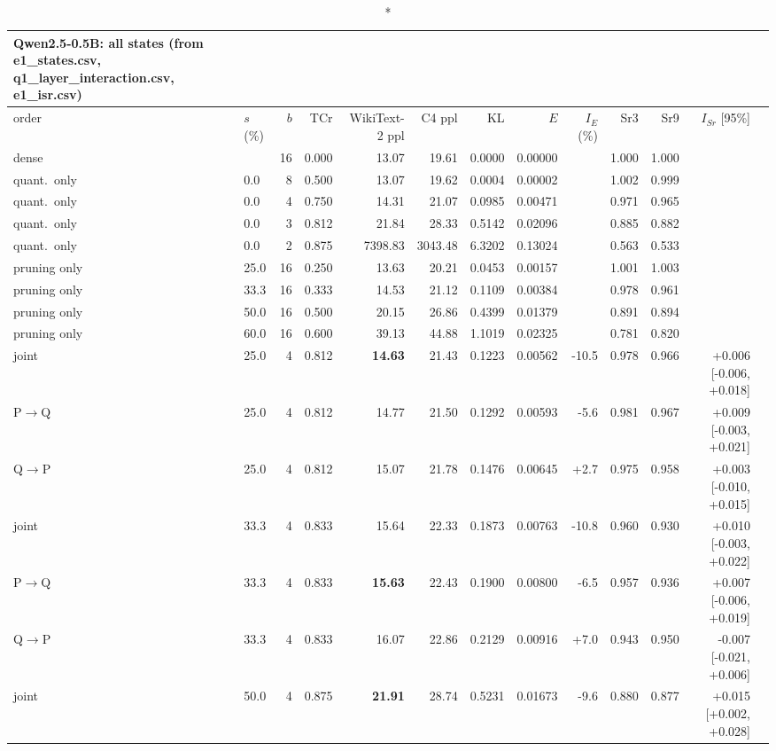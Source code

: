 \documentclass{article}
\begin{document}
\begin{longtable}{llrrrrrrrrrrl}
\caption*{\textbf{Qwen2.5-0.5B}: all states (from e1\_states.csv, q1\_layer\_interaction.csv, e1\_isr.csv)}\\
\toprule order & $s$ (\%) & $b$ & TCr & WikiText-2 ppl & C4 ppl & KL & $E$ & $I_E$ (\%) & Sr3 & Sr9 & $I_{Sr}$ [95\%] \\ \midrule \endhead
dense &  & 16 & 0.000 & 13.07 & 19.61 & 0.0000 & 0.00000 &  & 1.000 & 1.000 &  \\
quant.\ only & 0.0 & 8 & 0.500 & 13.07 & 19.62 & 0.0004 & 0.00002 &  & 1.002 & 0.999 &  \\
quant.\ only & 0.0 & 4 & 0.750 & 14.31 & 21.07 & 0.0985 & 0.00471 &  & 0.971 & 0.965 &  \\
quant.\ only & 0.0 & 3 & 0.812 & 21.84 & 28.33 & 0.5142 & 0.02096 &  & 0.885 & 0.882 &  \\
quant.\ only & 0.0 & 2 & 0.875 & 7398.83 & 3043.48 & 6.3202 & 0.13024 &  & 0.563 & 0.533 &  \\
pruning only & 25.0 & 16 & 0.250 & 13.63 & 20.21 & 0.0453 & 0.00157 &  & 1.001 & 1.003 &  \\
pruning only & 33.3 & 16 & 0.333 & 14.53 & 21.12 & 0.1109 & 0.00384 &  & 0.978 & 0.961 &  \\
pruning only & 50.0 & 16 & 0.500 & 20.15 & 26.86 & 0.4399 & 0.01379 &  & 0.891 & 0.894 &  \\
pruning only & 60.0 & 16 & 0.600 & 39.13 & 44.88 & 1.1019 & 0.02325 &  & 0.781 & 0.820 &  \\
joint & 25.0 & 4 & 0.812 & \textbf{14.63} & 21.43 & 0.1223 & 0.00562 & -10.5 & 0.978 & 0.966 & +0.006 [-0.006, +0.018] \\
P$\to$Q & 25.0 & 4 & 0.812 & 14.77 & 21.50 & 0.1292 & 0.00593 & -5.6 & 0.981 & 0.967 & +0.009 [-0.003, +0.021] \\
Q$\to$P & 25.0 & 4 & 0.812 & 15.07 & 21.78 & 0.1476 & 0.00645 & +2.7 & 0.975 & 0.958 & +0.003 [-0.010, +0.015] \\
joint & 33.3 & 4 & 0.833 & 15.64 & 22.33 & 0.1873 & 0.00763 & -10.8 & 0.960 & 0.930 & +0.010 [-0.003, +0.022] \\
P$\to$Q & 33.3 & 4 & 0.833 & \textbf{15.63} & 22.43 & 0.1900 & 0.00800 & -6.5 & 0.957 & 0.936 & +0.007 [-0.006, +0.019] \\
Q$\to$P & 33.3 & 4 & 0.833 & 16.07 & 22.86 & 0.2129 & 0.00916 & +7.0 & 0.943 & 0.950 & -0.007 [-0.021, +0.006] \\
joint & 50.0 & 4 & 0.875 & \textbf{21.91} & 28.74 & 0.5231 & 0.01673 & -9.6 & 0.880 & 0.877 & +0.015 [+0.002, +0.028] \\

\end{longtable}
\end{document}
